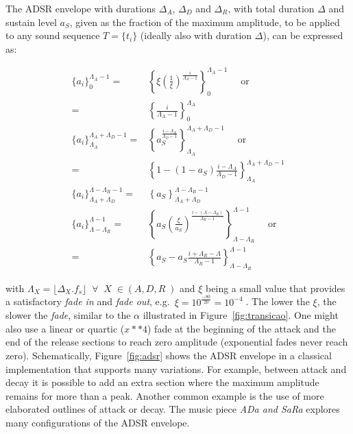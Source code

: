 The ADSR envelope with durations $\Delta_A$, $\Delta_D$ and $\Delta_R$, with total duration $\Delta$ and sustain level $a_S$, given as the fraction of the maximum amplitude, to be applied to any sound sequence $T=\{t_i\}$ (ideally also with duration $\Delta$), can be expressed as:

\begin{equation}\label{eq:adsr}
\begin{split}
\{a_i\}_0^{\Lambda_A-1}  = & \left\{\xi\left(\frac{1}{\xi}\right)^{\frac{i}{\Lambda_A-1}}\right\}_0^{\Lambda_A-1} \quad \text{ or }\\ = & \left\{\frac{i}{\Lambda_A-1}\right\}_0^{\Lambda_A}\\
\{a_i\}_{\Lambda_A}^{\Lambda_A+\Lambda_D-1} = & \left\{a_S^{\frac{i-\Lambda_A}{\Lambda_D-1}}  \right\}_{\Lambda_A}^{\Lambda_A+\Lambda_D-1} \quad \text{ or } \\ = &  \left\{1-(1-a_S)\frac{i-\Lambda_A}{\Lambda_D-1}\right\}_{\Lambda_A}^{\Lambda_A+\Lambda_D-1}\\
\{ a_i \}_{\Lambda_A+\Lambda_D}^{\Lambda-\Lambda_R-1} = & \left\{ a_S \right\}_{\Lambda_A+\Lambda_D}^{\Lambda-\Lambda_R-1} \\
\{ a_i \}_{\Lambda-\Lambda_R}^{\Lambda-1}  = & \left\{ a_S\left(\frac{\xi}{a_S} \right)^{\frac{i-(\Lambda-\Lambda_R)}{\Lambda_R-1}} \right\}_{\Lambda-\Lambda_R}^{\Lambda-1} \quad \text{ or } \\ = &  \left\{ a_S - a_S\frac{i+\Lambda_R-\Lambda}{\Lambda_R-1}\right\}_{\Lambda-\Lambda_R}^{\Lambda-1} 
\end{split}
\end{equation}

\noindent with $\Lambda_X=\lfloor \Delta_X . f_s \rfloor\;\;\forall\;\; X \; \in
(A,D,R\;)$ and $\xi$ being a small value that provides a satisfactory \emph{fade in} and \emph{fade out}, e.g.\ $\xi=10^{\frac{-80}{20}}=10^{-4}\;$.
The lower the $\xi$, the slower the \emph{fade}, similar to the $\alpha$ illustrated in Figure~\ref{fig:transicao}.
One might also use a linear or quartic ($x**4$) fade at the beginning of the attack and the end of the release
sections to reach zero amplitude (exponential fades never reach zero).
Schematically, Figure~\ref{fig:adsr} shows the ADSR envelope in a classical implementation that supports many variations.
For example, between attack and decay it is possible to add an extra section where the maximum amplitude remains for more than a peak.
Another common example is the use of more elaborated outlines of attack or decay.
The music piece \emph{ADa and SaRa} explores many configurations of the ADSR envelope.~\cite{MASSA}

